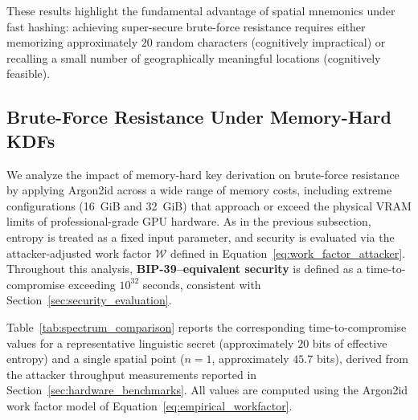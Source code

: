 \documentclass[journal,article,accept,pdftex,moreauthors]{Definitions/mdpi}
\begin{document}
These results highlight the fundamental advantage of spatial mnemonics under fast hashing: achieving super-secure brute-force resistance requires either memorizing approximately $20$ random characters (cognitively impractical) or recalling a small number of geographically meaningful locations (cognitively feasible).

\subsection{Brute-Force Resistance Under Memory-Hard KDFs}
\label{sec:hardened_analysis}

We analyze the impact of memory-hard key derivation on brute-force resistance by applying Argon2id across a wide range of memory costs, including extreme configurations (16~GiB and 32~GiB) that approach or exceed the physical VRAM limits of professional-grade GPU hardware. As in the previous subsection, entropy is treated as a fixed input parameter, and security is evaluated via the attacker-adjusted work factor $\mathcal{W}$ defined in Equation~\ref{eq:work_factor_attacker}. Throughout this analysis, \textbf{BIP-39–equivalent security} is defined as a time-to-compromise exceeding $10^{32}$ seconds, consistent with Section~\ref{sec:security_evaluation}.

Table~\ref{tab:spectrum_comparison} reports the corresponding time-to-compromise values for a representative linguistic secret (approximately $20$ bits of effective entropy) and a single spatial point ($n=1$, approximately $45.7$ bits), derived from the attacker throughput measurements reported in Section~\ref{sec:hardware_benchmarks}. All values are computed using the Argon2id work factor model of Equation~\ref{eq:empirical_workfactor}.
\end{document}
